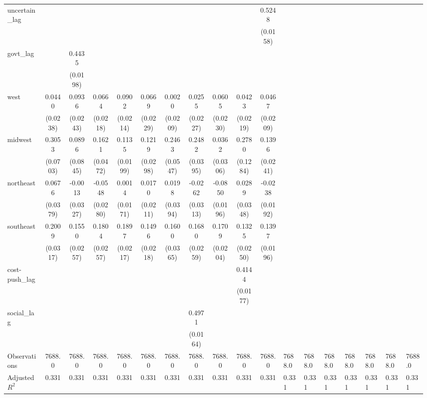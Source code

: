 \begin{tabular}{lcccccccccc}
uncertain_lag &  &  &  &  &  &  &  &  &  & 0.5248 \\
\vspace{0.2cm}
 &  &  &  &  &  &  &  &  &  & (0.0158) \\
govt_lag &  & 0.4435 &  &  &  &  &  &  &  &  \\
\vspace{0.2cm}
 &  & (0.0198) &  &  &  &  &  &  &  &  \\
west & 0.0440 & 0.0936 & 0.0664 & 0.0902 & 0.0669 & 0.0020 & 0.0255 & 0.0605 & 0.0423 & 0.0467 \\
\vspace{0.2cm}
 & (0.0238) & (0.0243) & (0.0218) & (0.0214) & (0.0229) & (0.0209) & (0.0227) & (0.0230) & (0.0219) & (0.0209) \\
midwest & 0.3053 & 0.0896 & 0.1621 & 0.1135 & 0.1219 & 0.2463 & 0.2482 & 0.0362 & 0.2780 & 0.1396 \\
\vspace{0.2cm}
 & (0.0703) & (0.0845) & (0.0472) & (0.0199) & (0.0298) & (0.0547) & (0.0395) & (0.0306) & (0.1284) & (0.0241) \\
northeast & 0.0676 & -0.0013 & -0.0548 & 0.0014 & 0.0170 & 0.0198 & -0.0262 & -0.0850 & 0.0289 & -0.0238 \\
\vspace{0.2cm}
 & (0.0379) & (0.0327) & (0.0280) & (0.0171) & (0.0211) & (0.0394) & (0.0313) & (0.0196) & (0.0348) & (0.0192) \\
southeast & 0.2009 & 0.1550 & 0.1804 & 0.1897 & 0.1496 & 0.1600 & 0.1680 & 0.1709 & 0.1325 & 0.1397 \\
\vspace{0.2cm}
 & (0.0317) & (0.0257) & (0.0257) & (0.0217) & (0.0218) & (0.0365) & (0.0259) & (0.0204) & (0.0250) & (0.0196) \\
cost-push_lag &  &  &  &  &  &  &  &  & 0.4144 &  \\
\vspace{0.2cm}
 &  &  &  &  &  &  &  &  & (0.0177) &  \\
social_lag &  &  &  &  &  &  & 0.4971 &  &  &  \\
\vspace{0.2cm}
 &  &  &  &  &  &  & (0.0164) &  &  &  \\
\midrule
Observations & 7688.0 & 7688.0 & 7688.0 & 7688.0 & 7688.0 & 7688.0 & 7688.0 & 7688.0 & 7688.0 & 7688.0 & 7688.0 & 7688.0 & 7688.0 & 7688.0 & 7688.0 & 7688.0 & 7688.0 \\
Adjusted $R^2$ & 0.331 & 0.331 & 0.331 & 0.331 & 0.331 & 0.331 & 0.331 & 0.331 & 0.331 & 0.331 & 0.331 & 0.331 & 0.331 & 0.331 & 0.331 & 0.331 & 0.331 \\
\bottomrule
\end{tabular}